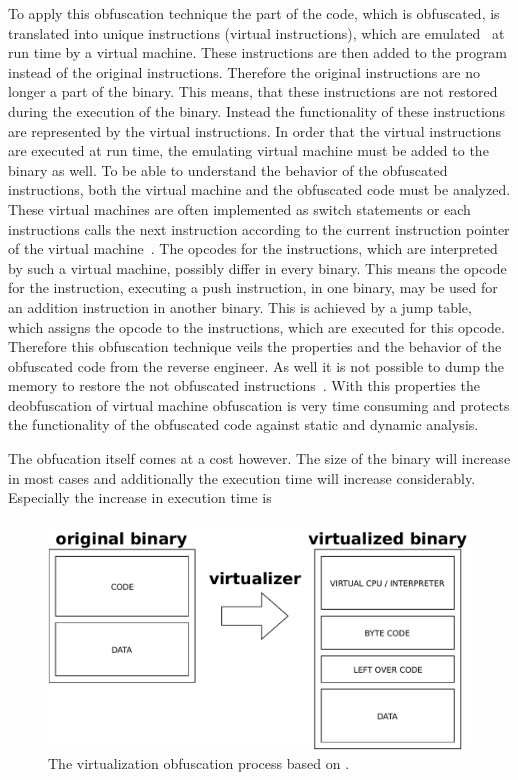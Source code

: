 \documentclass[10pt,twoside,a4paper,bibliography=totoc]{scrbook}
\begin{document}
To apply this obfuscation technique the part of the code, which is 
obfuscated, is translated into unique instructions (virtual instructions), which are emulated~\cite{malobfs} at run time by a virtual machine.
These instructions are then added to the program instead of the original instructions.
Therefore the original instructions are no longer a part of the binary.
This means, that these instructions are not restored during the execution of the binary.
Instead the functionality of these instructions are represented by the virtual instructions.
In order that the virtual instructions are executed at run time, the emulating virtual machine 
must be added to the binary as well.
To be able to understand the behavior of the obfuscated instructions, both the virtual
machine and the obfuscated code must be analyzed.
These virtual machines are often implemented as switch statements or each instructions 
calls the next instruction according to the current instruction pointer of the virtual 
machine~\cite{rolles}.
The opcodes for the instructions, which are interpreted by such a virtual machine, possibly differ
in every binary.
This means the opcode for the instruction, executing a push instruction, in one binary,
may be used for an addition instruction in another binary. 
This is achieved by a jump table, which assigns the opcode to the instructions, which 
are executed for this opcode.
Therefore this obfuscation technique veils the properties and the behavior 
of the obfuscated code from the reverse engineer.
As well it is not possible to dump the memory to restore the not obfuscated 
instructions~\cite{createvmi}.
With this properties the deobfuscation of virtual machine obfuscation is very time 
consuming and protects the functionality of the obfuscated code against static and
dynamic analysis. 

The obfucation itself comes at a cost however. The size of the binary will increase in most cases and additionally the execution time will increase considerably. Especially the increase in execution time is


\begin{figure}[htp]
\centering
\includegraphics[scale=0.8]{images/ch2/virtualization_process.pdf} 
\caption{The virtualization obfuscation process based on \cite{symantec_clampi}. }
\label{virtualization_process}
\end{figure}
\end{document}
